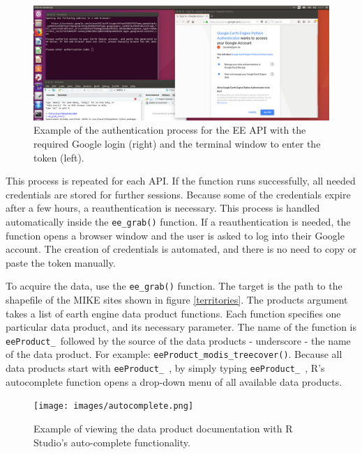 \begin{center}
	\begin{figure}[h]
		\begin{center}
			\includegraphics[width=15cm]{images/install_authentication.png}
			\caption{Example of the authentication process for the EE API with the required Google login (right) and the terminal window to enter the token (left).}
			\label{install}
		\end{center}
	\end{figure}
\end{center}



This process is repeated for each API. If the function runs successfully, all needed credentials are stored for further sessions. Because some of the credentials expire after a few hours, a reauthentication is necessary. This process is handled automatically inside the \texttt{ee\_grab()} function. If a reauthentication is needed, the function opens a browser window and the user is asked to log into their Google account. The creation of credentials is automated, and there is no need to copy or paste the token manually.

To acquire the data, use the \texttt{ee\_grab()} function. The target is the path to the shapefile of the MIKE sites shown in figure \ref{territories}. The products argument takes a list of earth engine data product functions. Each function specifies one particular data product, and its necessary parameter. The name of the function is \texttt{eeProduct\_ }followed by the source of the data products - underscore - the name of the data product. For example: \texttt{eeProduct\_modis\_treecover()}. Because all data products start with \texttt{eeProduct\_ }, by simply typing \texttt{eeProduct\_ }, R's autocomplete function opens a drop-down menu of all available data products. 

\begin{center}
	\begin{figure}[h]
		\begin{center}
			\texttt{[image: images/autocomplete.png]}
			\caption{Example of viewing the data product documentation with R Studio's auto-complete functionality.}
			\label{install}
		\end{center}
	\end{figure}
\end{center}



